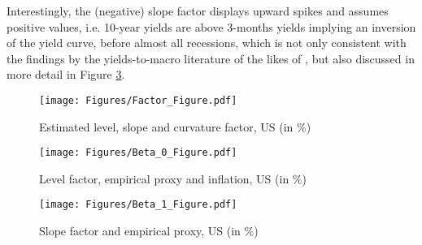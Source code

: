 Interestingly, the (negative) slope factor displays upward spikes and assumes positive values, i.e. 10-year yields are above 3-months yields implying an inversion of the yield curve, before almost all recessions, which is not only consistent with the findings by the yields-to-macro literature of the likes of \citet{estrella1991term}, but also discussed in more detail in Figure \ref{fig:slope_factor_us}.

\begin{figure}[!t]
    \centering
    \texttt{[image: Figures/Factor\_Figure.pdf]}
    \caption{Estimated level, slope and curvature factor, US (in \%)}
    \label{fig:factors_us}
\end{figure}

\begin{figure}[!t]
    \centering
    \texttt{[image: Figures/Beta\_0\_Figure.pdf]}
    \caption{Level factor, empirical proxy and inflation, US (in \%)}
    \label{fig:level_factor_us}
\end{figure}

\begin{figure}[!t]
    \centering
    \texttt{[image: Figures/Beta\_1\_Figure.pdf]}
    \caption{Slope factor and empirical proxy, US (in \%)}
    \label{fig:slope_factor_us}
\end{figure}

